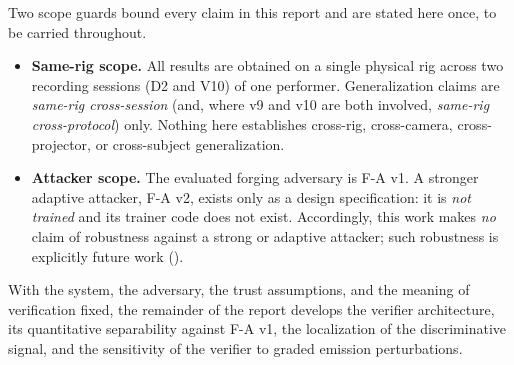 Two scope guards bound every claim in this report and are stated here once, to be carried throughout.

\begin{itemize}
  \item \textbf{Same-rig scope.} All results are obtained on a single physical rig across two recording sessions (D2 and V10) of one performer. Generalization claims are \emph{same-rig cross-session} (and, where v9 and v10 are both involved, \emph{same-rig cross-protocol}) only. Nothing here establishes cross-rig, cross-camera, cross-projector, or cross-subject generalization.
  \item \textbf{Attacker scope.} The evaluated forging adversary is F-A v1. A stronger adaptive attacker, F-A v2, exists only as a design specification: it is \emph{not trained} and its trainer code does not exist. Accordingly, this work makes \emph{no} claim of robustness against a strong or adaptive attacker; such robustness is explicitly future work ().
\end{itemize}

With the system, the adversary, the trust assumptions, and the meaning of verification fixed, the remainder of the report develops the verifier architecture, its quantitative separability against F-A v1, the localization of the discriminative signal, and the sensitivity of the verifier to graded emission perturbations.

